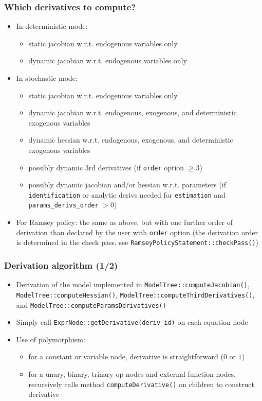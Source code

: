 \documentclass{beamer}
\begin{document}
\begin{frame}
  \frametitle{Which derivatives to compute?}
  \begin{itemize}
  \item In deterministic mode:
    \begin{itemize}
    \item static jacobian w.r.t. endogenous variables only
    \item dynamic jacobian w.r.t. endogenous variables only
    \end{itemize}
  \item In stochastic mode:
    \begin{itemize}
    \item static jacobian w.r.t. endogenous variables only
    \item dynamic jacobian w.r.t. endogenous, exogenous, and deterministic exogenous variables
    \item dynamic hessian w.r.t. endogenous, exogenous, and deterministic exogenous variables
    \item possibly dynamic 3rd derivatives (if \texttt{order} option $\geq 3$)
    \item possibly dynamic jacobian and/or hessian w.r.t. parameters (if \texttt{identification} or analytic derivs needed for \texttt{estimation} and \texttt{params\_derivs\_order} $>0$)
    \end{itemize}
  \item For Ramsey policy: the same as above, but with one further order of derivation than declared by the user with \texttt{order} option (the derivation order is determined in the check pass, see \texttt{RamseyPolicyStatement::checkPass()})
  \end{itemize}
\end{frame}

\begin{frame}
  \frametitle{Derivation algorithm (1/2)}
  \begin{itemize}
  \item Derivation of the model implemented in \texttt{ModelTree::computeJacobian()}, \texttt{ModelTree::computeHessian()}, \texttt{ModelTree::computeThirdDerivatives()}, and \texttt{ModelTree::computeParamsDerivatives()}
  \item Simply call \texttt{ExprNode::getDerivative(deriv\_id)} on each equation node
  \item Use of polymorphism:
    \begin{itemize}
    \item for a constant or variable node, derivative is straightforward ($0$ or $1$)
    \item for a unary, binary, trinary op nodes and external function nodes, recursively calls method \texttt{computeDerivative()} on children to construct derivative
    \end{itemize}
  \end{itemize}
\end{frame}
\end{document}
